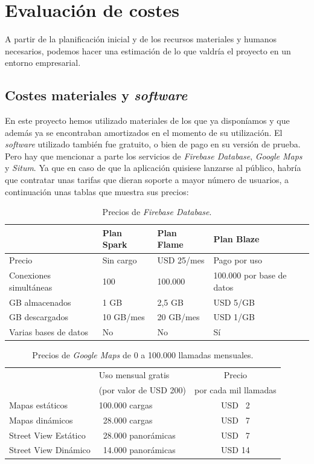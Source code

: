 \section{Evaluación de costes}
A partir de la planificación inicial y de los recursos materiales y humanos necesarios, podemos hacer una estimación de lo que valdría el proyecto en un entorno empresarial.

\subsection{Costes materiales y \textit{software}}
En este proyecto hemos utilizado materiales de los que ya disponíamos y que además ya se encontraban amortizados en el momento de su utilización.
El \textit{software} utilizado también fue gratuito, o bien de pago en su versión de prueba.
Pero hay que mencionar a parte los servicios de \textit{Firebase Database}, \textit{Google Maps} y \textit{Situm}. Ya que en caso de que la aplicación quisiese lanzarse al público, habría que contratar unas tarifas que dieran soporte a mayor número de usuarios, a continuación unas tablas que muestra sus precios:
\begin{table}[btp]
\begin{center}
\small
\begin{tabular}{|l|l|l|l|}
\hline 
& Plan Spark & Plan Flame & Plan Blaze \\
\hline \hline
Precio & Sin cargo & USD 25/mes & Pago por uso \\ \hline
Conexiones simultáneas & 100 & 100.000 & 100.000 por  base de datos \\ \hline
GB almacenados & 1 GB & 2,5 GB & USD 5/GB   \\ \hline
GB descargados & 10 GB/mes & 20 GB/mes & USD 1/GB   \\ \hline
Varias bases de datos  & No & No & Sí  \\ \hline
\end{tabular}
\caption{Precios de \textit{Firebase Database}.}
\label{precios:firebase_db}
\end{center}
\end{table}

\begin{table}[btp]
\begin{center}
\small
\begin{tabular}{|l|l|c|}
\hline 
& Uso mensual gratis & Precio  \\
& (por valor de USD 200) &  por cada mil llamadas \\
\hline \hline
Mapas estáticos & 100.000 cargas & USD ~2 \\ \hline
Mapas dinámicos & ~28.000 cargas & USD ~7 \\ \hline
Street View Estático & ~28.000 panorámicas & USD ~7   \\ \hline
Street View Dinámico & ~14.000 panorámicas & USD 14   \\ \hline
\end{tabular}
\caption{Precios de \textit{Google Maps} de 0 a 100.000 llamadas mensuales.}
\label{precios:googlemaps}
\end{center}
\end{table}

